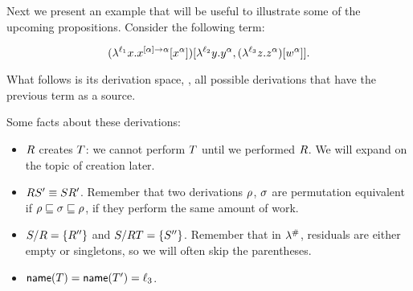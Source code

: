 \bigskip
\begin{example}
Next we present an example that will be useful to illustrate
some of the upcoming propositions. Consider the following term:

\[
  (\lambda^{\ell_1} x. x^{[\alpha] \to \alpha} [x^\alpha])
    [\lambda^{\ell_2} y. y^\alpha,
    (\lambda^{\ell_3} z. z^\alpha) [w^\alpha]].
\]

What follows is its derivation space, \ie,
all possible derivations that have the previous term as a source.

{\footnotesize
{}
}
\end{example}

Some facts about these derivations:

\begin{itemize}
  \item $R$ creates $T$: we cannot perform $T$ until we performed $R$. We will expand on the topic of creation later.
  \item $R S' \equiv S R'$. Remember that two derivations $\rho$,
    $\sigma$ are permutation equivalent if $\rho \sqsubseteq \sigma \sqsubseteq \rho$,
    \ie if they perform the same amount of work.
  \item $S / R = \{R''\}$ and
    $S / R T = \{S''\}$. Remember that in $\lambda^{\mathtt{\#}}$,
    residuals are either empty or singletons, so we will often skip the parentheses.
  \item $\mathsf{name}(T) = \mathsf{name}(T') = \ell_3$.
\end{itemize}
